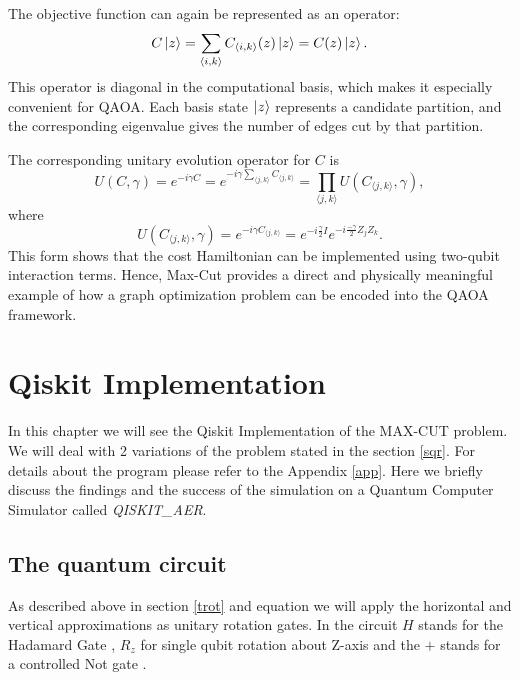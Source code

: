 \documentclass[english,12pt,a4paper]{report}
\begin{document}
	The objective function can again be represented as an operator:
	\[
	C\ket{z}=\sum_{\langle i,k\rangle}C_{\langle i,k\rangle}(z)\ket{z}=C(z)\ket{z}.
	\]
	This operator is diagonal in the computational basis, which makes it especially convenient for QAOA. Each basis state $\ket{z}$ represents a candidate partition, and the corresponding eigenvalue gives the number of edges cut by that partition.
	
	The corresponding unitary evolution operator for $C$ is
	\begin{equation}
		U(C,\gamma)= e^{-i\gamma C} = e^{-i\gamma \sum_{\langle j,k\rangle}C_{\langle j,k\rangle}}=\prod_{\langle j,k\rangle}U(C_{\langle j,k\rangle},\gamma),
	\end{equation}
	where
	\[
	U(C_{\langle j,k\rangle},\gamma) = e^{-i\gamma C_{\langle j,k\rangle}}=e^{-i\frac{\gamma}{2}I}e^{-i\frac{-\gamma}{2}Z_jZ_k}.
	\]
	This form shows that the cost Hamiltonian can be implemented using two-qubit interaction terms. Hence, Max-Cut provides a direct and physically meaningful example of how a graph optimization problem can be encoded into the QAOA framework.
	\chapter{Qiskit Implementation}
	In this chapter we will see the Qiskit Implementation of the MAX-CUT problem. We will deal with 2 variations of the problem stated in the section \ref{sqr}. For details about the program please refer to the Appendix \ref{app}. Here we briefly discuss the findings and the success of the simulation on a Quantum Computer Simulator called \emph{QISKIT\_AER}. 
	\section{The quantum circuit}
	As described above in section \ref{trot} and equation  we will apply the horizontal and vertical approximations as unitary rotation gates. In the circuit $H$ stands for the Hadamard Gate , $R_z$ for single qubit rotation about Z-axis and the $+$ stands for a controlled Not gate \cite{nielsen}.
	
\end{document}
